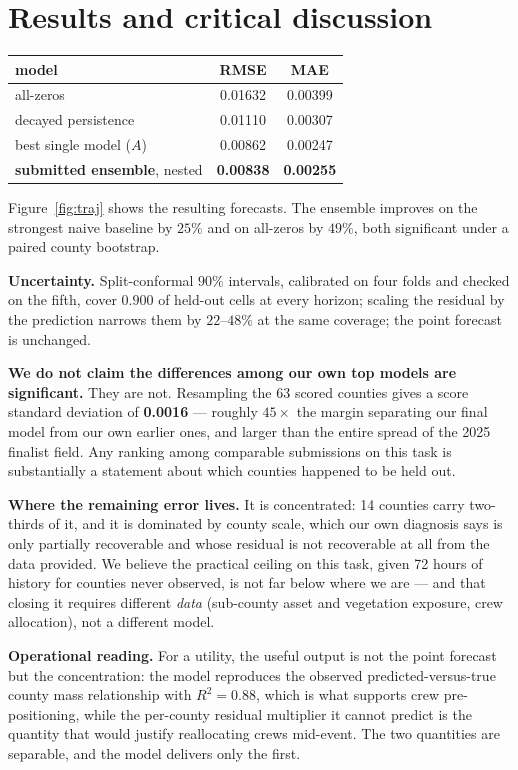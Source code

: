 \documentclass[10pt,letterpaper,twocolumn]{article}
\begin{document}
\section{Results and critical discussion}
\label{sec:results}

\begin{center}\small
\begin{tabular}{lcc}
\toprule
model & RMSE & MAE \\
\midrule
all-zeros & 0.01632 & 0.00399 \\
decayed persistence & 0.01110 & 0.00307 \\
best single model ($A$) & 0.00862 & 0.00247 \\
\textbf{submitted ensemble}, nested & \textbf{0.00838} & \textbf{0.00255} \\
\bottomrule
\end{tabular}
\end{center}
Figure~\ref{fig:traj} shows the resulting forecasts.
The ensemble improves on the strongest naive baseline by $25\%$ and on all-zeros
by $49\%$, both significant under a paired county bootstrap.

\textbf{Uncertainty.} Split-conformal $90\%$ intervals, calibrated on four
folds and checked on the fifth, cover $0.900$ of held-out cells at every
horizon; scaling the residual by the prediction narrows them by $22$--$48\%$
at the same coverage; the point forecast is unchanged.

\textbf{We do not claim the differences among our own top models are
significant.} They are not. Resampling the 63 scored counties
gives a score standard deviation of \textbf{0.0016} --- roughly $45\times$ the
margin separating our final model from our own earlier ones, and larger than the
entire spread of the 2025 finalist field. Any ranking among comparable
submissions on this task is substantially a statement about which counties
happened to be held out.

\textbf{Where the remaining error lives.} It is concentrated: 14 counties carry
two-thirds of it, and it is dominated by county scale, which our own
diagnosis says is only partially recoverable and whose residual is not
recoverable at all from the data provided. We believe the practical ceiling on
this task, given 72 hours of history for counties never observed, is not far
below where we are --- and that closing it requires different \emph{data}
(sub-county asset and vegetation exposure, crew allocation), not a different
model.

\textbf{Operational reading.} For a utility, the useful output is not the point
forecast but the concentration: the model reproduces the observed
predicted-versus-true county mass relationship with $R^2 = 0.88$, which is what
supports crew pre-positioning, while the per-county residual multiplier it cannot
predict is the quantity that would justify reallocating crews mid-event. The
two quantities are separable, and the model delivers only the first.
\end{document}
